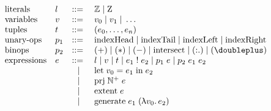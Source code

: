 \begin{figure}
\centering
%
%
%

\begin{displaymath}
\begin{array}{llcl}
  $literals$    & l   & \bnfdef{} & \mathbb{Z} \alt{} $Z$                             \\
  $variables$   & v   & \bnfdef{} & v_0 \alt{} v_1 \alt{} \dots              \\
  $tuples$      & t   & \bnfdef{} & (e_0,\dots,e_n)                          \\
  $unary-ops$   & p_1 & \bnfdef{} & $indexHead$
                                     \alt{} $indexTail$
                                     \alt{} $indexLeft$
                                     \alt{} $indexRight$                     \\
  $binops$      & p_2 & \bnfdef{} & (+) \alt{} (*) \alt (-)
                                        \alt{} $intersect$
                                        \alt{} ($:.$)
                                        \alt{} (\doubleplus)                 \\
  $expressions$ & e   & \bnfdef{} & l
                           \alt{}   v
                           \alt{}   t
                           \alt{}   e_1\; !\; e_2
                           \alt{}   p_1\; e
                           \alt{}   p_2\; e_1\; e_2                          \\
                &     &    \alt{} & $let$\; v_0 = e_1\; $in$\; e_2           \\
                &     &    \alt{} & $prj$\; \mathbb{N}^{+}\; e                            \\
                &     &    \alt{} & $extent$\; e                             \\
                &     &    \alt{} & $generate$\; e_1\; (\uplambda v_0.\, e_2)   \\

\end{array}
\end{displaymath}
\end{figure}
